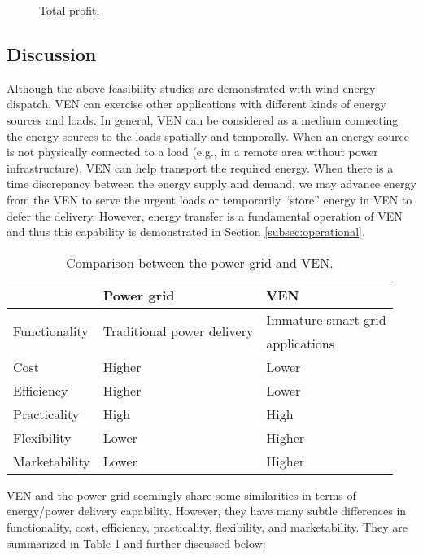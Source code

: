 \documentclass[journal]{IEEEtran}
\begin{document}
\begin{figure}[!t]
	\begin{center}
	\end{center}
	\caption{Total profit.}
  \label{fig:econ}
	\vspace{-0.6cm}
\end{figure}

\subsection{Discussion}
Although the above feasibility studies are demonstrated with wind energy dispatch, VEN can exercise other applications with different kinds of energy sources and loads. In general, VEN can be considered as a medium connecting the energy sources to the loads spatially and temporally. When an energy source is not physically connected to a load (e.g., in a remote area without power infrastructure), VEN can help transport the required energy. When there is a time discrepancy between the energy supply and demand, we may advance energy from the VEN to serve the urgent loads or temporarily “store” energy in VEN to defer the delivery. However, energy transfer is a fundamental operation of VEN and thus this capability is demonstrated in Section \ref{subsec:operational}.



\begin{table}[!t]
\renewcommand{\arraystretch}{1.3}
\caption{Comparison between the power grid and VEN.}
\label{tab:compare}
\centering
\begin{tabular}{l|l|l}
\hline\hline
 & Power grid & VEN\\
\hline
\multirow{2}{*}{Functionality} 			&  \multirow{2}{*}{Traditional power delivery}		& Immature smart grid  \\
										&																& applications \\
Cost					&	 Higher	& Lower\\
Efficiency 		& Higher	& Lower\\
Practicality	& High		& High	\\
Flexibility		& Lower		& Higher\\
Marketability & Lower		& Higher\\
\hline\hline
\end{tabular}
\vspace{-0.3cm}
\end{table}
VEN and the power grid seemingly share some similarities in terms of energy/power delivery capability. However, they have many subtle differences in functionality, cost, efficiency, practicality, flexibility, and marketability. They are summarized in Table \ref{tab:compare} and further discussed below:
\end{document}
